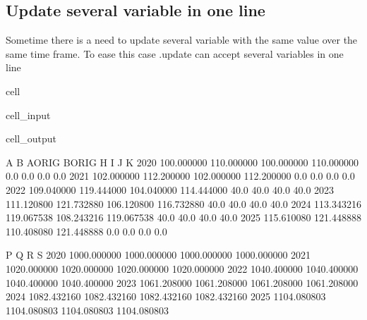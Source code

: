 \documentclass[letterpaper,10pt,english]{jupyterBook}
\begin{document}
\subsection{Update several variable in one line}
\label{\detokenize{content/04_PythonEssentials/UpdateCommand:update-several-variable-in-one-line}}
\sphinxAtStartPar
Sometime there is a need to update several variable with the same value over the same time frame. To ease this case .update can accept several variables in one line

\begin{sphinxuseclass}{cell}\begin{sphinxVerbatimInput}

\begin{sphinxuseclass}{cell_input}
\begin{sphinxVerbatim}[commandchars=\\\{\}]
\end{sphinxVerbatim}

\end{sphinxuseclass}\end{sphinxVerbatimInput}
\begin{sphinxVerbatimOutput}

\begin{sphinxuseclass}{cell_output}
\begin{sphinxVerbatim}[commandchars=\\\{\}]
               A           B      A\PYGZus{}ORIG      B\PYGZus{}ORIG     H     I     J     K   
2020  100.000000  110.000000  100.000000  110.000000   0.0   0.0   0.0   0.0  \PYGZbs{}
2021  102.000000  112.200000  102.000000  112.200000   0.0   0.0   0.0   0.0   
2022  109.040000  119.444000  104.040000  114.444000  40.0  40.0  40.0  40.0   
2023  111.120800  121.732880  106.120800  116.732880  40.0  40.0  40.0  40.0   
2024  113.343216  119.067538  108.243216  119.067538  40.0  40.0  40.0  40.0   
2025  115.610080  121.448888  110.408080  121.448888   0.0   0.0   0.0   0.0   

                P            Q            R            S  
2020  1000.000000  1000.000000  1000.000000  1000.000000  
2021  1020.000000  1020.000000  1020.000000  1020.000000  
2022  1040.400000  1040.400000  1040.400000  1040.400000  
2023  1061.208000  1061.208000  1061.208000  1061.208000  
2024  1082.432160  1082.432160  1082.432160  1082.432160  
2025  1104.080803  1104.080803  1104.080803  1104.080803  
\end{sphinxVerbatim}

\end{sphinxuseclass}\end{sphinxVerbatimOutput}

\end{sphinxuseclass}
\end{document}
